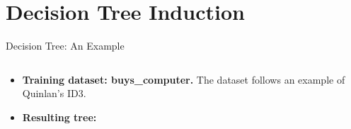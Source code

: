 \section{Decision Tree Induction}

\begin{frame}{Decision Tree: An Example}
	\begin{columns}
		\begin{column}{0.38\textwidth}
			\vspace{-3cm}
			\begin{itemize}
				\item \textbf{Training dataset: buys\_computer.}\newline
				      The dataset follows an example of Quinlan's ID3.
				\item \textbf{Resulting tree:}\\[0.1cm]
			\end{itemize}
			\centering
			
		\end{column}
		\begin{column}{0.62\textwidth}
			\small
			
		\end{column}
	\end{columns}
\end{frame}


